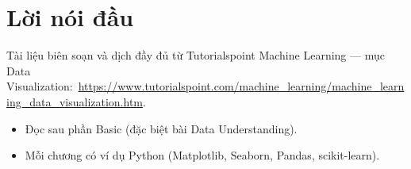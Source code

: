 \documentclass[12pt,a4paper]{article}
\newcommand{\tsurl}[1]{\url{#1}}
\begin{document}

\newpage
\tableofcontents
\newpage

\section*{Lời nói đầu}

\begin{ynghia}[title={Nguồn}]
Tài liệu biên soạn và dịch đầy đủ từ Tutorialspoint Machine Learning --- mục Data Visualization:\ \tsurl{https://www.tutorialspoint.com/machine_learning/machine_learning_data_visualization.htm}.
\end{ynghia}

\begin{phuongphap}[title={Cách dùng}]
\begin{itemize}
  \item Đọc sau phần Basic (đặc biệt bài Data Understanding).
  \item Mỗi chương có ví dụ Python (Matplotlib, Seaborn, Pandas, scikit-learn).
\end{itemize}
\end{phuongphap}

\newpage







\end{document}

